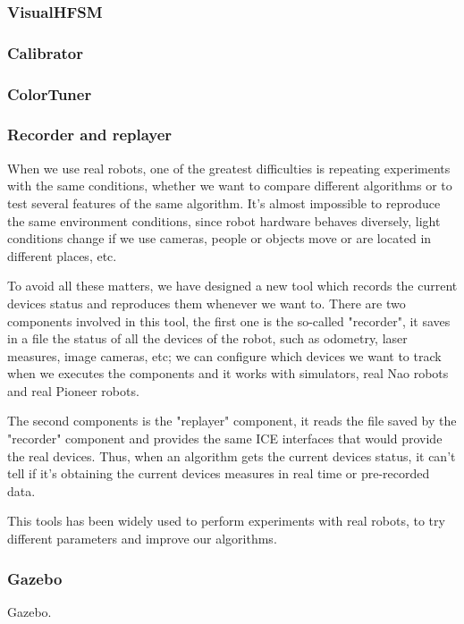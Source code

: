 \documentclass[twocolumn]{svjour3}          %
\begin{document}
\subsubsection{VisualHFSM}
\subsubsection{Calibrator}
\subsubsection{ColorTuner}
\subsubsection{Recorder and replayer}

When we use real robots, one of the greatest difficulties is repeating experiments with the same conditions, whether we want to compare different algorithms or to test several features of the same algorithm. It's almost impossible to reproduce the same environment conditions, since robot hardware behaves diversely, light conditions change if we use cameras, people or objects move or are located in different places, etc.

To avoid all these matters, we have designed a new tool which records the current devices status and reproduces them whenever we want to. There are two components involved in this tool, the first one is the so-called "recorder", it saves in a file the status of all the devices of the robot, such as odometry, laser measures, image cameras, etc; we can configure which devices we want to track when we executes the components and it works with simulators, real Nao robots and real Pioneer robots.

The second components is the "replayer" component, it reads the file saved by the "recorder" component and provides the same ICE interfaces that would provide the real devices. Thus, when an algorithm gets the current devices status, it can't tell if it's obtaining the current devices measures in real time or pre-recorded data.

This tools has been widely used to perform experiments with real robots, to try different parameters and improve our algorithms.

\subsubsection{Gazebo}

Gazebo.
\end{document}

